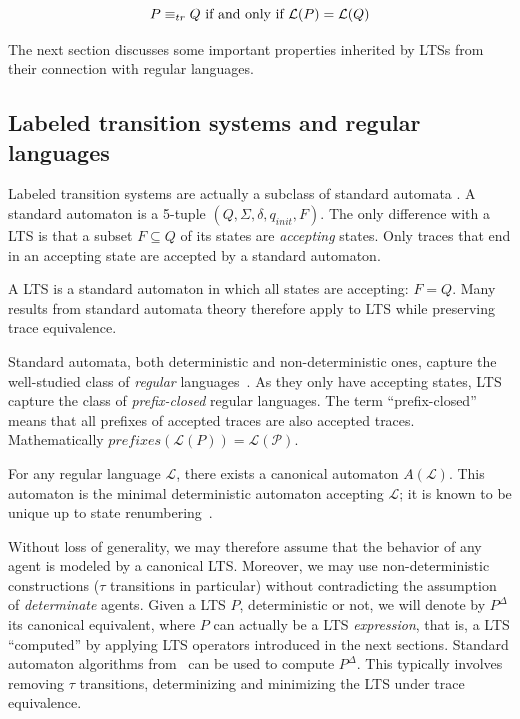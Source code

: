 \begin{equation}
P \equiv_{tr} Q$~if~and~only~if~$\mathcal{L}(P) = \mathcal{L}(Q)
\end{equation}

The next section discusses some important properties inherited by LTSs from their connection with regular languages. 

\subsection{Labeled transition systems and regular languages\label{section:background-lts-and-regular-languages}}

Labeled transition systems are actually a subclass of standard automata \cite{Hopcroft:1979}. A standard automaton is a 5-tuple $(Q,\Sigma,\delta,q_{init},F)$. The only difference with a LTS is that a subset $F \subseteq Q$ of its states are \emph{accepting} states. Only traces that end in an accepting state are accepted by a standard automaton. 

A LTS is a standard automaton in which all states are accepting: $F = Q$. Many results from standard automata theory therefore apply to LTS while preserving trace equivalence.

Standard automata, both deterministic and non-deterministic ones, capture the well-studied class of \emph{regular} languages~\cite{Hopcroft:1979}. As they only have accepting states, LTS capture the class of \emph{prefix-closed} regular languages. The term ``prefix-closed'' means that all prefixes of accepted traces are also accepted traces. Mathematically $prefixes(\mathcal{L}(P)) = \mathcal{L(P)}$.

For any regular language $\mathcal{L}$, there exists a canonical automaton $A(\mathcal{L})$. This automaton is the minimal deterministic automaton accepting $\mathcal{L}$; it is known to be unique up to state renumbering~\cite{Gold:1978}. 

Without loss of generality, we may therefore assume that the behavior of any agent is modeled by a canonical LTS. Moreover, we may use non-deterministic constructions ($\tau$ transitions in particular) without contradicting the assumption of \emph{determinate} agents. Given a LTS $P$, deterministic or not, we will denote by $P^{\Delta}$ its canonical equivalent, where $P$ can actually be a LTS \emph{expression}, that is, a LTS ``computed'' by applying LTS operators introduced in the next sections. Standard automaton algorithms from~\cite{Hopcroft:1979} can be used to compute $P^\Delta$. This typically involves removing $\tau$ transitions, determinizing and minimizing the LTS under trace equivalence.

